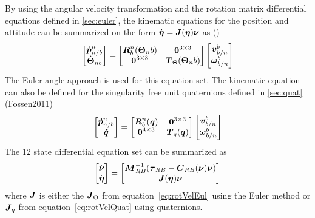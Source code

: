 By using the angular velocity transformation and the rotation matrix differential equations defined in \ref{sec:euler}, the kinematic equations for the position and attitude can be summarized on the
form $\boldsymbol{\dot{\boldsymbol{\eta}}}=\boldsymbol{J}(\boldsymbol{\eta})\boldsymbol{\nu}$ as (\cite{Fossen2011})
\begin{equation}\label{eq:rotVelEul}
  \begin{bmatrix}
    \boldsymbol{\dot{p}}_{n/b}^n\\
    \boldsymbol{\dot{\Theta}}_{nb}\\
  \end{bmatrix}
  =
  \begin{bmatrix}
    \boldsymbol{R}_b^n(\boldsymbol{\Theta}_nb) & \boldsymbol{0}^{3 \times 3}\\
    \boldsymbol{0}^{3 \times 3} & \boldsymbol{T}_{\Theta}(\boldsymbol{\Theta}_nb)
  \end{bmatrix}
  \begin{bmatrix}
    \boldsymbol{v}_{b/n}^b\\
    \boldsymbol{\omega}_{b/n}^b
  \end{bmatrix}
\end{equation}
The Euler angle approach is used for this equation set. The kinematic equation can also be defined for the singularity free unit quaternions defined in \ref{sec:quat} (Fossen2011)
\begin{equation}\label{eq:rotVelQuat}
  \begin{bmatrix}
    \boldsymbol{\dot{p}}_{n/b}^n\\
    \boldsymbol{\dot{q}}\\
  \end{bmatrix}
  =
  \begin{bmatrix}
    \boldsymbol{R}_b^n(\boldsymbol{q}) & \boldsymbol{0}^{3 \times 3}\\
    \boldsymbol{0}^{4 \times 3} & \boldsymbol{T}_{q}(\boldsymbol{q})
  \end{bmatrix}
  \begin{bmatrix}
    \boldsymbol{v}_{b/n}^b\\
    \boldsymbol{\omega}_{b/n}^b
  \end{bmatrix}
\end{equation}
The 12 state differential equation set can be summarized as
\begin{equation}
  \begin{bmatrix}
    \dot{\boldsymbol{\nu}}\\
    \dot{\boldsymbol{\eta}}
  \end{bmatrix}
  =
  \begin{bmatrix}
    \boldsymbol{M}_{RB}^{-1}(\boldsymbol{\tau}_{RB}-\boldsymbol{C}_{RB}(\boldsymbol{\nu})\boldsymbol{\nu})\\
    \boldsymbol{J}(\boldsymbol{\eta})\boldsymbol{\nu}
  \end{bmatrix}
\end{equation}
where $\boldsymbol{J}$ is either the $\boldsymbol{J}_\Theta$ from equation~\ref{eq:rotVelEul} using the Euler method or $\boldsymbol{J}_q$ from equation~\ref{eq:rotVelQuat} using quaternions.

